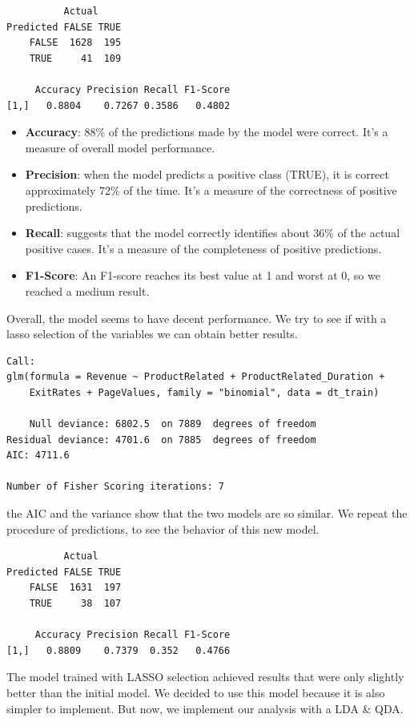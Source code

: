 \documentclass[
]{article}
\begin{document}
\begin{verbatim}
          Actual
Predicted FALSE TRUE
    FALSE  1628  195
    TRUE     41  109

     Accuracy Precision Recall F1-Score
[1,]   0.8804    0.7267 0.3586   0.4802
\end{verbatim}

\begin{itemize}
\item
  \textbf{Accuracy}: 88\% of the predictions made by the model were
  correct. It's a measure of overall model performance.
\item
  \textbf{Precision}: when the model predicts a positive class (TRUE),
  it is correct approximately 72\% of the time. It's a measure of the
  correctness of positive predictions.
\item
  \textbf{Recall}: suggests that the model correctly identifies about
  36\% of the actual positive cases. It's a measure of the completeness
  of positive predictions.
\item
  \textbf{F1-Score}: An F1-score reaches its best value at 1 and worst
  at 0, so we reached a medium result.
\end{itemize}

Overall, the model seems to have decent performance. We try to see if
with a lasso selection of the variables we can obtain better results.

\begin{verbatim}
Call:
glm(formula = Revenue ~ ProductRelated + ProductRelated_Duration + 
    ExitRates + PageValues, family = "binomial", data = dt_train)

    Null deviance: 6802.5  on 7889  degrees of freedom
Residual deviance: 4701.6  on 7885  degrees of freedom
AIC: 4711.6

Number of Fisher Scoring iterations: 7
\end{verbatim}

the AIC and the variance show that the two models are so similar. We
repeat the procedure of predictions, to see the behavior of this new
model.

\begin{verbatim}
          Actual
Predicted FALSE TRUE
    FALSE  1631  197
    TRUE     38  107

     Accuracy Precision Recall F1-Score
[1,]   0.8809    0.7379  0.352   0.4766
\end{verbatim}

The model trained with LASSO selection achieved results that were only
slightly better than the initial model. We decided to use this model
because it is also simpler to implement. But now, we implement our
analysis with a LDA \& QDA.
\end{document}
